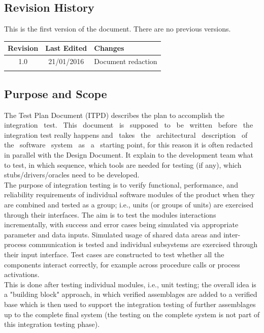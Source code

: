 \documentclass[a4paper,11pt]{report} %
\begin{document}
	\subsection{Revision History}
		This is the first version of the document. There are no previous versions.
		
		\begin{center}
			\begin{tabular}{| l | p{2.5cm} | p{9cm} |}\hline
				\multicolumn{1}{|c|}{\textbf{Revision}} & \multicolumn{1}{|c|}{\textbf{Last Edited}} & \textbf{Changes}\\\hline
				\multicolumn{1}{|c|}{1.0} & \multicolumn{1}{|c|}{21/01/2016} & Document redaction\\\hline
				 & & \\\hline
			\end{tabular}
		\end{center}
		
	\subsection{Purpose and Scope}
		The Test Plan Document (ITPD) describes the plan to accomplish the  integration  test.  This  document  is  supposed  to  be  written  before  the  integration  test  really  happens and  takes  the  architectural  description  of  the  software  system  as  a  starting point, for this reason it is often redacted in parallel with the Design Document. It explain to the development team what to test, in which sequence, which tools are needed for testing (if any), which stubs/drivers/oracles need to be developed.\\		
		The purpose of integration testing is to verify functional, performance, and reliability requirements of individual software modules of the product when they are combined and tested as a group; i.e., units (or groups of units) are exercised through their interfaces. The aim is to test the modules interactions incrementally, with success and error cases being simulated via appropriate parameter and data inputs. Simulated usage of shared data areas and inter-process communication is tested and individual subsystems are exercised through their input interface. Test cases are constructed to test whether all the components interact correctly, for example across procedure calls or process activations.\\
		This is done after testing individual modules, i.e., unit testing; the overall idea is a "building block" approach, in which verified assemblages are added to a verified base which is then used to support the integration testing of further assemblages up to the complete final system (the testing on the complete system is not part of this integration testing phase).
		
\end{document}
